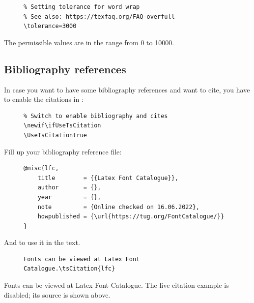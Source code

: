 \begin{figure}[H]
    \small
    \centering
    \begin{BVerbatim}
% Setting tolerance for word wrap
% See also: https://texfaq.org/FAQ-overfull
\tolerance=3000
    \end{BVerbatim}
\end{figure}

The permissible values are in the range from 0 to 10000.

\subsection{Bibliography references}\label{subsec:Bibliography references}

In case you want to have some bibliography references and want to cite, you
have to enable the citations in :

\begin{figure}[H]
    \small
    \centering
    \begin{BVerbatim}
% Switch to enable bibliography and cites
\newif\ifUseTsCitation
\UseTsCitationtrue
    \end{BVerbatim}
\end{figure}

Fill up your bibliography reference file:

\begin{figure}[H]
    \small
    \centering
    \begin{BVerbatim}
@misc{lfc,
    title        = {{Latex Font Catalogue}},
    author       = {},
    year         = {},
    note         = {Online checked on 16.06.2022},
    howpublished = {\url{https://tug.org/FontCatalogue/}}
}
    \end{BVerbatim}
\end{figure}

And to use it in the text.

\begin{figure}[H]
    \small
    \centering
    \begin{BVerbatim}
Fonts can be viewed at Latex Font Catalogue.\tsCitation{lfc}
    \end{BVerbatim}
\end{figure}

\ifUseTsCitation
    Fonts can be viewed at Latex Font Catalogue.
\else
    The live citation example is disabled; its source is shown above.
\fi
